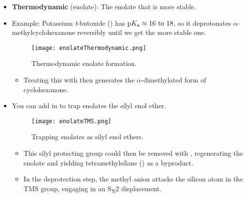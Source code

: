 \documentclass[../notes.tex]{subfiles}
\begin{document}
\begin{itemize}
\begin{itemize}
    \end{itemize}
    \pagebreak
    \item \textbf{Thermodynamic} (enolate): The enolate that is more stable.
    \item Example: Potassium \emph{t}-butoxide () has $\pKa\approx\text{\numrange{16}{18}}$, so it deprotonates $\alpha$-methylcyclohexanone reversibly until we get the more stable one.
    \begin{figure}[h!]
        \centering
        \texttt{[image: enolateThermodynamic.png]}
        \caption{Thermodynamic enolate formation.}
        \label{fig:enolateThermodynamic}
    \end{figure}
    \begin{itemize}
        \item Treating this with  then generates the $\alpha$-dimethylated form of cyclohexanone.
    \end{itemize}
    \item You can add in  to trap enolates the silyl enol ether.
    \begin{figure}[h!]
        \centering
        \texttt{[image: enolateTMS.png]}
        \caption{Trapping enolates as silyl enol ethers.}
        \label{fig:enolateTMS}
    \end{figure}
    \begin{itemize}
        \item This silyl protecting group could then be removed with , regenerating the enolate and yielding tetramethylsilane () as a byproduct.
        \item In the deprotection step, the methyl anion attacks the silicon atom in the TMS group, engaging in an S\textsubscript{N}2 displacement.
    \end{itemize}
\end{itemize}
\end{document}
